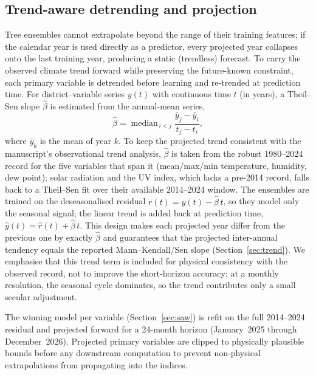 \documentclass[pdflatex,sn-basic,lineno]{sn-jnl}
\begin{document}
\subsection{Trend-aware detrending and projection}\label{sec:detrend}
Tree ensembles cannot extrapolate beyond the range of their training features;
if the calendar year is used directly as a predictor, every projected year
collapses onto the last training year, producing a static (trendless) forecast.
To carry the observed climate trend forward while preserving the future-known
constraint, each primary variable is detrended before learning and re-trended at
prediction time. For district--variable series $y(t)$ with continuous time $t$
(in years), a Theil--Sen slope $\hat{\beta}$ is estimated from the
annual-mean series,
\begin{equation}
\hat{\beta}=\operatorname{median}_{\,i<j}
\frac{\bar{y}_{j}-\bar{y}_{i}}{t_{j}-t_{i}},
\label{eq:theilsen}
\end{equation}
where $\bar{y}_{k}$ is the mean of year $k$. To keep the projected trend
consistent with the manuscript's observational trend analysis, $\hat{\beta}$ is
taken from the robust 1980--2024 record for the five variables that span it
(mean/max/min temperature, humidity, dew point); solar radiation and the UV
index, which lacks a pre-2014 record, falls back to a Theil--Sen fit over their
available 2014--2024 window. The ensembles are trained on the deseasonalised
residual $r(t)=y(t)-\hat{\beta}\,t$, so they model only the seasonal signal;
the linear trend is added back at prediction time,
$\hat{y}(t)=\hat{r}(t)+\hat{\beta}\,t$. This design makes each projected year
differ from the previous one by exactly $\hat{\beta}$ and guarantees that the
projected inter-annual tendency equals the reported Mann--Kendall/Sen slope
(Section~\ref{sec:trend}). We emphasise that this trend term is included for
physical consistency with the observed record, not to improve the short-horizon
accuracy: at a monthly resolution, the seasonal cycle dominates, so the trend
contributes only a small secular adjustment.

The winning model per variable (Section~\ref{sec:saw}) is refit on the full
2014--2024 residual and projected forward for a 24-month horizon (January~2025
through December~2026). Projected primary variables are clipped to
physically plausible bounds before any downstream computation to prevent
non-physical extrapolations from propagating into the indices.
\end{document}
